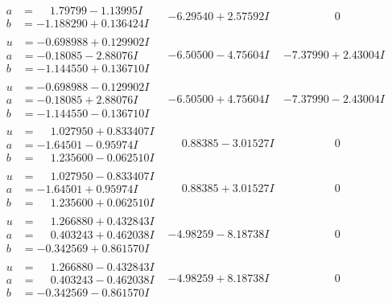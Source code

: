 \documentclass[1p]{elsarticle_modified}
\theoremstyle{definition}
\begin{document}
$$\begin{array}{c|c|c}
\begin{aligned}
a &= \phantom{-}1.79799 - 1.13995 I \\
b &= -1.188290 + 0.136424 I\end{aligned}
 & -6.29540 + 2.57592 I & \phantom{-0.000000 } 0 \\ \hline\begin{aligned}
u &= -0.698988 + 0.129902 I \\
a &= -0.18085 - 2.88076 I \\
b &= -1.144550 + 0.136710 I\end{aligned}
 & -6.50500 - 4.75604 I & -7.37990 + 2.43004 I \\ \hline\begin{aligned}
u &= -0.698988 - 0.129902 I \\
a &= -0.18085 + 2.88076 I \\
b &= -1.144550 - 0.136710 I\end{aligned}
 & -6.50500 + 4.75604 I & -7.37990 - 2.43004 I \\ \hline\begin{aligned}
u &= \phantom{-}1.027950 + 0.833407 I \\
a &= -1.64501 - 0.95974 I \\
b &= \phantom{-}1.235600 - 0.062510 I\end{aligned}
 & \phantom{-}0.88385 - 3.01527 I & \phantom{-0.000000 } 0 \\ \hline\begin{aligned}
u &= \phantom{-}1.027950 - 0.833407 I \\
a &= -1.64501 + 0.95974 I \\
b &= \phantom{-}1.235600 + 0.062510 I\end{aligned}
 & \phantom{-}0.88385 + 3.01527 I & \phantom{-0.000000 } 0 \\ \hline\begin{aligned}
u &= \phantom{-}1.266880 + 0.432843 I \\
a &= \phantom{-}0.403243 + 0.462038 I \\
b &= -0.342569 + 0.861570 I\end{aligned}
 & -4.98259 - 8.18738 I & \phantom{-0.000000 } 0 \\ \hline\begin{aligned}
u &= \phantom{-}1.266880 - 0.432843 I \\
a &= \phantom{-}0.403243 - 0.462038 I \\
b &= -0.342569 - 0.861570 I\end{aligned}
 & -4.98259 + 8.18738 I & \phantom{-0.000000 } 0\\

\end{array}$$
\end{document}

